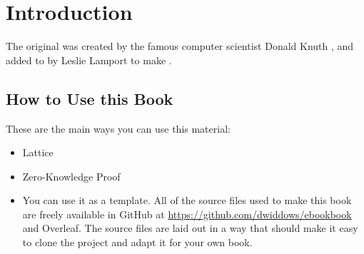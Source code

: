 
\chapter{Introduction}

The original \tex was created by the famous computer scientist Donald Knuth \citep{knuth1984texbook},
and added to by Leslie Lamport to make \latex \citep{lamport1985latex}.

\section{How to Use this Book}
These are the main ways you can use this material:

\begin{itemize}
    \item Lattice
    \item Zero-Knowledge Proof
    \item You can use it as a template. All of the source files used to make this book
    are freely available in GitHub at {\small \url{https://github.com/dwiddows/ebookbook}} and Overleaf.
    The source files are laid out in a way that should make it easy to clone the project and adapt it for your own book.
\end{itemize}
